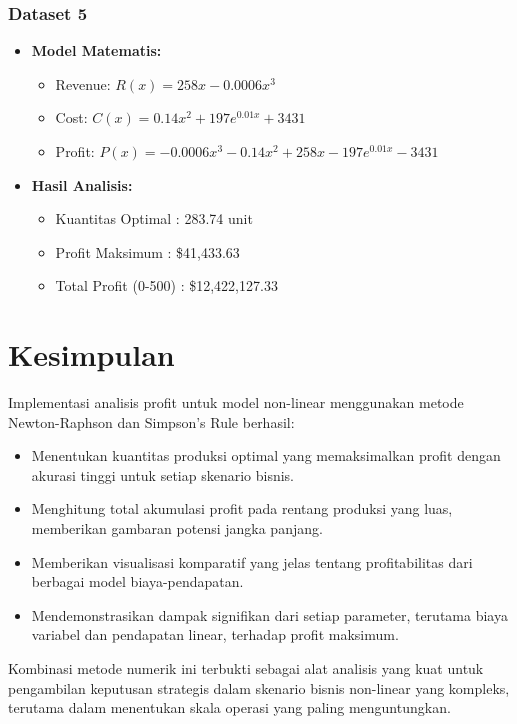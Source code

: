 \documentclass[conference]{IEEEtran}
\begin{document}
\subsubsection{Dataset 5}
\begin{itemize}
    \item \textbf{Model Matematis:}
    \begin{itemize}
        \item Revenue: \( R(x) = 258x - 0.0006x^3 \)
        \item Cost: \( C(x) = 0.14x^2 + 197e^{0.01x} + 3431 \)
        \item Profit: \( P(x) = -0.0006x^3 - 0.14x^2 + 258x - 197e^{0.01x} - 3431 \)
    \end{itemize}
    \item \textbf{Hasil Analisis:}
    \begin{itemize}
        \item Kuantitas Optimal : 283.74 unit
        \item Profit Maksimum  : \$41,433.63
        \item Total Profit (0-500) : \$12,422,127.33
    \end{itemize}
\end{itemize}

\section{Kesimpulan}
Implementasi analisis profit untuk model non-linear menggunakan metode Newton-Raphson dan Simpson's Rule berhasil:
\begin{itemize}
    \item Menentukan kuantitas produksi optimal yang memaksimalkan profit dengan akurasi tinggi untuk setiap skenario bisnis.
    \item Menghitung total akumulasi profit pada rentang produksi yang luas, memberikan gambaran potensi jangka panjang.
    \item Memberikan visualisasi komparatif yang jelas tentang profitabilitas dari berbagai model biaya-pendapatan.
    \item Mendemonstrasikan dampak signifikan dari setiap parameter, terutama biaya variabel dan pendapatan linear, terhadap profit maksimum.
\end{itemize}
Kombinasi metode numerik ini terbukti sebagai alat analisis yang kuat untuk pengambilan keputusan strategis dalam skenario bisnis non-linear yang kompleks, terutama dalam menentukan skala operasi yang paling menguntungkan.
\end{document}
